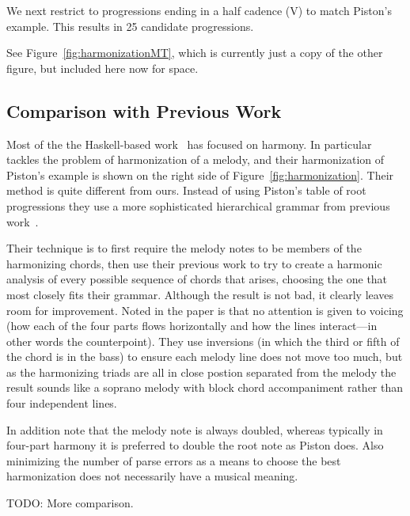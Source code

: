 We next restrict to progressions ending in a half cadence (V) to match
Piston's example. This results in 25 candidate progressions.

See Figure~\ref{fig:harmonizationMT}, which is currently just a copy of
the other figure, but included here now for space.

\HarmonizationMT

\subsection{Comparison with Previous Work}
\label{sec:harmony:compare}

Most of the the Haskell-based
work~\citep{magalhaes-harmtrace,koops-fharm,magalhaes-fcomp} has
focused on harmony. In particular \fharm~\citep{koops-fharm} tackles
the problem of harmonization of a melody, and their harmonization of
Piston's example is shown on the right side of
Figure~\ref{fig:harmonization}. Their method is quite different from
ours. Instead of using Piston's table of root progressions they use a
more sophisticated hierarchical grammar from previous
work~\citep{magalhaes-harmtrace}.

Their technique is to first require the melody notes to be members of
the harmonizing chords, then use their previous work to try to create
a harmonic analysis of every possible sequence of chords that arises,
choosing the one that most closely fits their grammar. Although the
result is not bad, it clearly leaves room for improvement. Noted in
the paper is that no attention is given to voicing (how each of the
four parts flows horizontally and how the lines interact---in other
words the counterpoint). They use inversions (in which the
third or fifth of the chord is in the bass) to ensure each melody line
does not move too much, but as the harmonizing triads are all in close
postion separated from the melody the result sounds like a soprano
melody with block chord accompaniment rather than four independent
lines.

In addition note that the melody note is always doubled, whereas
typically in four-part harmony it is preferred to double the root note
as Piston does. Also minimizing the number of parse errors as a means
to choose the best harmonization does not necessarily have a musical
meaning.

TODO: More comparison.
